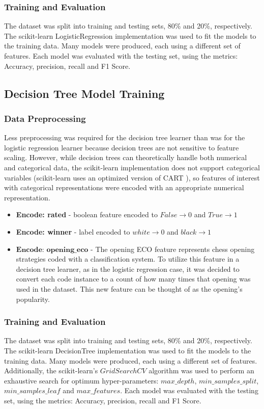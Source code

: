 \documentclass[12pt]{article}
\begin{document}
\subsubsection{Training and Evaluation}

The dataset was split into training and testing sets, 80\% and 20\%, respectively. The scikit-learn LogisticRegression implementation was used to fit the models to the training data. Many models were produced, each using a different set of features. Each model was evaluated with the testing set, using the metrics: Accuracy, precision, recall and F1 Score.

\subsection{Decision Tree Model Training}

\subsubsection{Data Preprocessing}
Less preprocessing was required for the decision tree learner than was for the logistic regression learner because decision trees are not sensitive to feature scaling. However, while decision trees can theoretically handle both numerical and categorical data, the scikit-learn implementation does not support categorical variables \cite{sklearnDT} (scikit-learn uses an optimized version of CART \cite{classificationTrees1984}), so features of interest with categorical representations were encoded with an appropriate numerical representation.

\begin{itemize}[label={}, leftmargin=0pt]
  \item \textbf{Encode: rated} - boolean feature encoded to $False \rightarrow 0$ and $True \rightarrow 1$
  \item \textbf{Encode: winner} - label encoded to $white \rightarrow 0$ and $black \rightarrow 1$
  \item $\textbf{Encode: opening\_eco}$ - The opening ECO feature represents chess opening strategies coded with a classification system. To utilize this feature in a decision tree learner, as in the logistic regression case, it was decided to convert each code instance to a count of how many times that opening was used in the dataset. This new feature can be thought of as the opening's popularity. 
\end{itemize}

\subsubsection{Training and Evaluation}
The dataset was split into training and testing sets, 80\% and 20\%, respectively. The scikit-learn DecisionTree implementation was used to fit the models to the training data. Many models were produced, each using a different set of features. Additionally, the scikit-learn's $GridSearchCV$ \cite{sklearnGSCV} algorithm was used to perform an exhaustive search for optimum hyper-parameters: $max\_depth$, $min\_samples\_split$, $min\_samples\_leaf$ and $max\_features$. Each model was evaluated with the testing set, using the metrics: Accuracy, precision, recall and F1 Score.
\end{document}
